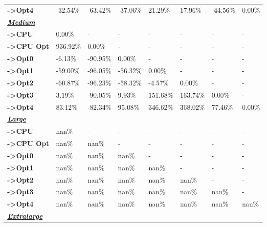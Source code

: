 \begin{table}[H]
\begin{tabular}{llllllll}
    \rowcolor[HTML]{EFEFEF} \cellcolor[HTML]{DAE8FC} \textbf{->Opt4} & -32.54\% & -63.42\% & -37.06\% & 21.29\% & 17.96\% & 	-44.56\% & 	0.00\% \\
    \cellcolor[HTML]{DAE8FC} \textbf{\textbf{{\emph{{\underline{{Medium}}}}}}} &  &  &  &  &  &  &  \\
    \rowcolor[HTML]{EFEFEF} \cellcolor[HTML]{DAE8FC} \textbf{->CPU} & 0.00\% & - & - & - & - & - & - \\
    \cellcolor[HTML]{DAE8FC} \textbf{->CPU Opt} & 936.92\% & 0.00\% & - & - & - & - & - \\
    \rowcolor[HTML]{EFEFEF} \cellcolor[HTML]{DAE8FC} \textbf{->Opt0} & -6.13\% & -90.95\% & 0.00\% & - & - & - & - \\
    \cellcolor[HTML]{DAE8FC} \textbf{->Opt1} & -59.00\% & -96.05\% & -56.32\% & 0.00\% & - & - & - \\
    \rowcolor[HTML]{EFEFEF} \cellcolor[HTML]{DAE8FC} \textbf{->Opt2} & -60.87\% & -96.23\% & -58.32\% & -4.57\% & 0.00\% & - & - \\
    \cellcolor[HTML]{DAE8FC} \textbf{->Opt3} & 3.19\% & -90.05\% & 9.93\% & 151.68\% & 163.74\% & 	0.00\% & - \\
    \rowcolor[HTML]{EFEFEF} \cellcolor[HTML]{DAE8FC} \textbf{->Opt4} & 83.12\% & -82.34\% & 95.08\% & 346.62\% & 368.02\% & 	77.46\% & 	0.00\% \\
    \cellcolor[HTML]{DAE8FC} \textbf{\textbf{{\emph{{\underline{{Large}}}}}}} &  &  &  &  &  &  &  \\
    \rowcolor[HTML]{EFEFEF} \cellcolor[HTML]{DAE8FC} \textbf{->CPU} & nan\% & - & - & - & - & - & - \\
    \cellcolor[HTML]{DAE8FC} \textbf{->CPU Opt} & nan\% & nan\% & - & - & - & - & - \\
    \rowcolor[HTML]{EFEFEF} \cellcolor[HTML]{DAE8FC} \textbf{->Opt0} & nan\% & nan\% & nan\% & - & - & - & - \\
    \cellcolor[HTML]{DAE8FC} \textbf{->Opt1} & nan\% & nan\% & nan\% & nan\% & - & - & - \\
    \rowcolor[HTML]{EFEFEF} \cellcolor[HTML]{DAE8FC} \textbf{->Opt2} & nan\% & nan\% & nan\% & nan\% & nan\% & - & - \\
    \cellcolor[HTML]{DAE8FC} \textbf{->Opt3} & nan\% & nan\% & nan\% & nan\% & nan\% & 	nan\% & - \\
    \rowcolor[HTML]{EFEFEF} \cellcolor[HTML]{DAE8FC} \textbf{->Opt4} & nan\% & nan\% & nan\% & nan\% & nan\% & 	nan\% & 	nan\% \\
    \cellcolor[HTML]{DAE8FC} \textbf{\textbf{{\emph{{\underline{{Extralarge}}}}}}} &  &  &  &  &  &  &  \\

\end{tabular}
\end{table}
